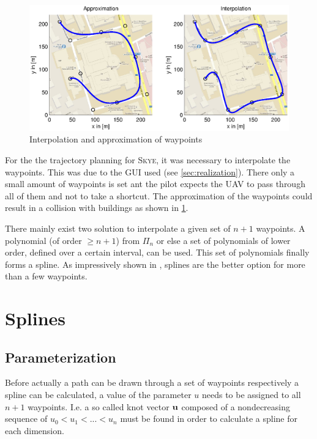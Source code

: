 \begin{figure}[H]
  \begin{minipage}[t]{0.9\textwidth}
    \includegraphics[width = \textwidth]{graphics/ApproxInterpol.eps}
  \end{minipage}
  \caption{Interpolation and approximation of waypoints}
  \label{fig:ApproxInterpol}
\end{figure}

For the the trajectory planning for \textsc{Skye}, it was necessary to interpolate the waypoints. This was due to the GUI used (see \ref{sec:realization}). There only a small amount of waypoints is set ant the pilot expects the UAV to pass through all of them and not to take a shortcut. The approximation of the waypoints could result in a collision with buildings as shown in \ref{fig:ApproxInterpol}.


There mainly exist two solution to interpolate a given set of $n+1$ waypoints. A polynomial (of order $\ge n+1$) from $\varPi_{n}$ or else a set of polynomials of lower order, defined over a certain interval, can be used. This set of polynomials finally forms a spline. As impressively shown in \cite{dahmen}, splines are the better option for more than a few waypoints. 



\section{Splines}
\label{sec:splines}
\subsection{Parameterization}
\label{subsec:parameterization}
Before actually a path can be drawn through a set of waypoints respectively a spline can be calculated, a value of the parameter $u$ needs to be assigned to all $n+1$ waypoints. I.e. a so called knot vector ${\bf u}$ composed of a nondecreasing sequence of $u_0 < u_1 < ...< u_n$ must be found in order to calculate a spline for each dimension.

